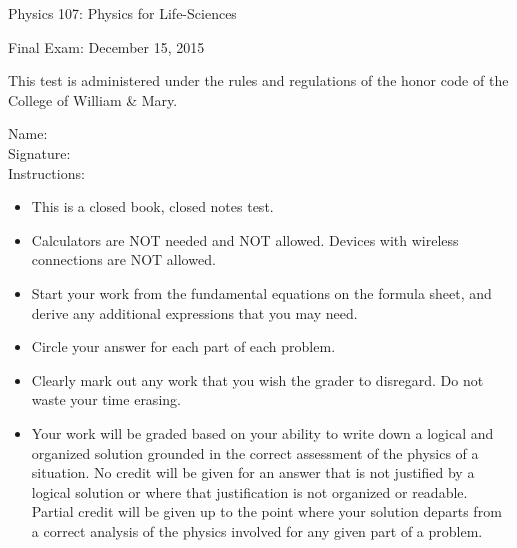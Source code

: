 \documentclass[letterpaper,addpoints,answers]{exam}
\begin{document}
\begin{coverpages}
 \large\bfseries
 
 \noindent 
 Physics 107: Physics for Life-Sciences

 \vspace{2ex}
 \noindent
 Final Exam: December 15, 2015

 \vspace{3ex}
 \noindent 
 This test is administered under the rules and regulations of the honor code of the College of William \& Mary.

 \vspace{2ex}
 \noindent 
 Name:\enspace\makebox[2.3in]{\hrulefill} \\

 \noindent 
 Signature:\enspace\makebox[2in]{\hrulefill} \\

 \vspace{5ex}
 \noindent 
 Instructions:
 \begin{itemize}
  \item This is a closed book, closed notes test.
  \item Calculators are NOT needed and NOT allowed. Devices with wireless connections are NOT allowed.
  \item Start your work from the fundamental equations on the formula sheet, and derive any additional expressions that you may need.
  \item Circle your answer for each part of each problem. 
  \item Clearly mark out any work that you wish the grader to disregard.  Do not waste your time erasing.
  \item Your work will be graded based on your ability to write down a logical and organized solution grounded in the correct assessment of the physics of a situation. No credit will be given for an answer that is not justified by a logical solution or where that justification is not organized or readable. Partial credit will be given up to the point where your solution departs from a correct analysis of the physics involved for any given part of a problem.
 \end{itemize}

 \pagebreak

 \begin{center}
  \gradetable[v][questions]
 \end{center}
 
\end{coverpages}
 
\end{document}
